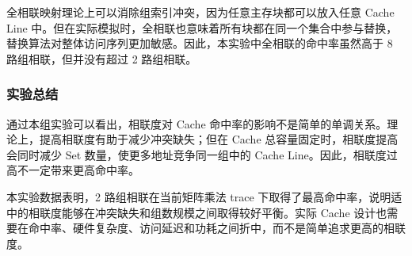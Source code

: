 全相联映射理论上可以消除组索引冲突，因为任意主存块都可以放入任意 Cache Line 中。但在实际模拟时，全相联也意味着所有块都在同一个集合中参与替换，替换算法对整体访问序列更加敏感。因此，本实验中全相联的命中率虽然高于 8 路组相联，但并没有超过 2 路组相联。

\subsubsection{实验总结}

通过本组实验可以看出，相联度对 Cache 命中率的影响不是简单的单调关系。理论上，提高相联度有助于减少冲突缺失；但在 Cache 总容量固定时，相联度提高会同时减少 Set 数量，使更多地址竞争同一组中的 Cache Line。因此，相联度过高不一定带来更高命中率。

本实验数据表明，2 路组相联在当前矩阵乘法 trace 下取得了最高命中率，说明适中的相联度能够在冲突缺失和组数规模之间取得较好平衡。实际 Cache 设计也需要在命中率、硬件复杂度、访问延迟和功耗之间折中，而不是简单追求更高的相联度。
